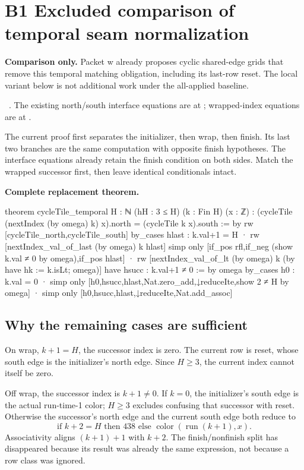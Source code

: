 \section{B1 Excluded comparison of temporal seam normalization}

\textbf{Comparison only.} Packet w already proposes cyclic shared-edge grids that remove this temporal matching obligation, including its last-row reset. The local variant below is not additional work under the all-applied baseline.

\ . The existing north/south interface equations are at ; wrapped-index equations are at .

The current proof first separates the initializer, then wrap, then finish. Its last two branches are the same computation with opposite finish hypotheses. The interface equations already retain the finish condition on both sides. Match the wrapped successor first, then leave identical conditionals intact.

\textbf{Complete replacement theorem.}
\begin{Lean}
theorem cycleTile_temporal {H : ℕ} (hH : 3 ≤ H) (k : Fin H) (x : ℤ) :
    (cycleTile (nextIndex (by omega) k) x).north = (cycleTile k x).south := by
  rw [cycleTile_north,cycleTile_south]
  by_cases hlast : k.val+1 = H
  · rw [nextIndex_val_of_last (by omega) k hlast]
    simp only [if_pos rfl,if_neg (show k.val ≠ 0 by omega),if_pos hlast]
  · rw [nextIndex_val_of_lt (by omega) k (by have hk := k.isLt; omega)]
    have hsucc : k.val+1 ≠ 0 := by omega
    by_cases h0 : k.val = 0
    · simp only [h0,hsucc,hlast,Nat.zero_add,↓reduceIte,show 2 ≠ H by omega]
    · simp only [h0,hsucc,hlast,↓reduceIte,Nat.add_assoc]
\end{Lean}

\subsection{Why the remaining cases are sufficient}
On wrap, $k+1=H$, the successor index is zero. The current row is reset, whose south edge is the initializer's north edge. Since $H\ge3$, the current index cannot itself be zero.

Off wrap, the successor index is $k+1\ne0$. If $k=0$, the initializer's south edge is the actual run-time-1 color; $H\ge3$ excludes confusing that successor with reset. Otherwise the successor's north edge and the current south edge both reduce to
\[
  \text{if }k+2=H\text{ then }438
  \text{ else }\operatorname{color}(\operatorname{run}(k+1),x).
\]
Associativity aligns $(k+1)+1$ with $k+2$. The finish/nonfinish split has disappeared because its result was already the same expression, not because a row class was ignored.

